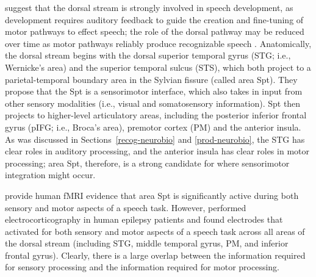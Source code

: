 {\citet{hickok2007}
suggest that the dorsal stream
is strongly involved in
speech development,
as development requires auditory feedback
to guide the creation and fine-tuning
of motor pathways to effect speech;
the role of the dorsal pathway may
be reduced over time as motor pathways
reliably produce recognizable speech
\citep{schmidt1975,doyon2003}.
Anatomically, the dorsal stream begins with
the dorsal superior temporal gyrus (STG; i.e., Wernicke's area)
and the superior temporal sulcus (STS),
which both project to
a parietal-temporal boundary area in the Sylvian fissure
(called area Spt).
They propose that the Spt is a sensorimotor interface,
which also takes in input from other sensory modalities
(i.e., visual and somatosensory information).
Spt then projects to higher-level articulatory areas,
including the posterior inferior frontal gyrus (pIFG; i.e., Broca's area),
premotor cortex (PM) and the anterior insula.
As was discussed in
Sections~\ref{recog-neurobio} and \ref{prod-neurobio},
the STG has clear roles in auditory processing,
and the anterior insula has clear roles in
motor processing;
area Spt, therefore, is a strong candidate
for where sensorimotor integration might occur.

\citet{hickok2009}
provide human fMRI evidence that
area Spt is significantly active
during both sensory and motor aspects
of a speech task.
However, \citet{cogan2014}
performed electrocorticography
in human epilepsy patients
and found electrodes that activated
for both sensory and motor aspects
of a speech task across all areas
of the dorsal stream
(including STG, middle temporal gyrus, PM,
and inferior frontal gyrus).
Clearly, there is a large overlap
between the information required for
sensory processing and the information required
for motor processing.

}

